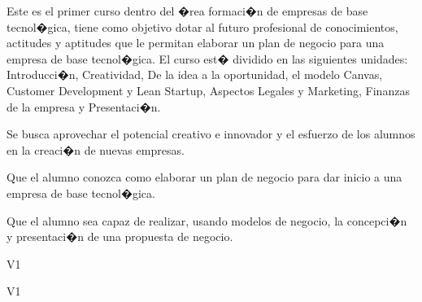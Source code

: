 \begin{syllabus}


\begin{justification}
Este es el primer curso dentro del �rea formaci�n de empresas de
base tecnol�gica, tiene como objetivo dotar al futuro profesional 
de conocimientos, actitudes y aptitudes que le
permitan elaborar un plan de negocio para una empresa de base tecnol�gica.
El curso est� dividido en las siguientes unidades:
Introducci�n, Creatividad, De la idea a la oportunidad, el modelo Canvas, Customer Development y Lean Startup, Aspectos Legales y Marketing, Finanzas de la empresa y Presentaci�n.

Se busca aprovechar el potencial creativo e innovador y el esfuerzo de los alumnos en la creaci�n de nuevas empresas.
\end{justification}

\begin{goals}
\item Que el alumno conozca como elaborar un plan de negocio para dar inicio a una empresa de base tecnol�gica.
\item Que el alumno sea capaz de realizar, usando modelos de negocio, la concepci�n y presentaci�n de una propuesta de negocio.
\end{goals}

\begin{outcomes}{V1}
    \item {}
    \item {}
    \item {}
    \item {}
    \item {}
\end{outcomes}

\begin{competences}{V1}
    \item {} %
    \item {} %
    \item {}
    \item {}
    \item {}
    \item {}
    \item {}
    \item {}
    

\end{competences}
\end{syllabus}
